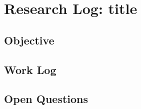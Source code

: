 \section*{{Research Log: {title}}}

\subsection*{{Objective}}


\subsection*{{Work Log}}


\subsection*{{Open Questions}}


